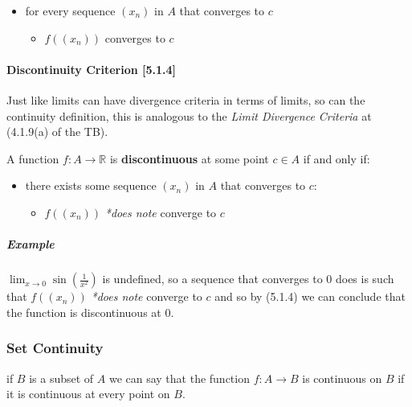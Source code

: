 \documentclass[
]{article}
\begin{document}
\begin{itemize}
\item
  for every sequence \((x_n)\) in \(A\) that converges to \(c\)

  \begin{itemize}
  \item
    \(f\left(\left( x_n \right) \right)\) converges to \(c\) 
  \end{itemize}
\end{itemize}

\hypertarget{header-n3923}{%
\paragraph{Discontinuity Criterion {[}5.1.4{]}}\label{header-n3923}}

Just like limits can have divergence criteria in terms of limits, so can
the continuity definition, this is analogous to the \emph{Limit
Divergence Criteria} at (4.1.9(a) of the TB).

A function \(f: A \rightarrow \mathbb{R}\) is \textbf{discontinuous} at
some point \(c \in A \) if and only if:

\begin{itemize}
\item
  there exists some sequence \((x_n)\) in \(A\) that converges to \(c\):

  \begin{itemize}
  \item
    \(f\left(\left( x_n \right) \right)\) \emph{*does note} converge to
    \(c\) 
  \end{itemize}
\end{itemize}

\hypertarget{header-n3932}{%
\subparagraph{Example}\label{header-n3932}}

\(\lim_{x\rightarrow 0} \sin(\frac{1}{x^2})\) is undefined, so a
sequence that converges to 0 does is such that
\(f\left(\left( x_n \right) \right)\) \emph{*does note} converge to
\(c\) and so by (5.1.4) we can conclude that the function is
discontinuous at 0.

\hypertarget{header-n3934}{%
\subsubsection{Set Continuity}\label{header-n3934}}

if \(B\) is a subset of \(A\) we can say that the function
\(f: A \rightarrow B \) is continuous on \(B\) if it is continuous at
every point on \(B\).
\end{document}
